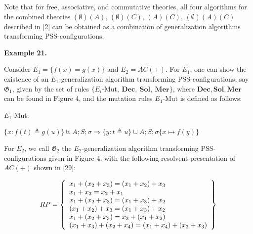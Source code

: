  
 
 
Note that for free, associative, and commutative theories, all four algorithms for the combined theories $(\emptyset)(A)$, $(\emptyset)(C)$, $(A)(C)$, $(\emptyset)(A)(C)$ described in [2] can be obtained as a combination of generalization algorithms transforming PSS-configurations.\par
 
 
 
\par\medskip\noindent\textbf{Example 21.}\par
 
 
Consider $E_{1}=\{f(x)=g(x)\}$ and $E_{2}=AC(+)$. For $E_{1}$, one can show the existence of an $E_{1}$-generalization algorithm transforming PSS-configurations, say $\mathfrak{G}_{1}$, given by the set of rules $\{\text{$E_{i}$-{Mut}},\ \textbf{Dec},\ \textbf{Sol},\ \textbf{Mer}\}$, where $\textbf{Dec},\textbf{Sol},\textbf{Mer}$ can be found in Figure 4, and the mutation rules $E_{1}$-Mut is defined as follows:\par
 
  
 
\par
 
$E_{1}$-Mut:\par
 
\par
 
$\{x:f(t)\triangleq g(u)\}\uplus A;S;\sigma\Longrightarrow\{y:t\triangleq u\}\cup A;S;\sigma\{x\mapsto f(y)\}$\par
 
  
 
For $E_{2}$, we call $\mathfrak{G}_{2}$ the $E_{2}$-generalization algorithm transforming PSS-configurations given in Figure 4, with the following resolvent presentation of $AC(+)$ shown in [29]:\par
  
\par  \quad  \[RP=\left\{\begin{array}[]{l}x_{1}+(x_{2}+x_{3})=(x_{1}+x_{2})+x_{3}\\
x_{1}+x_{2}=x_{2}+x_{1}\\
x_{1}+(x_{2}+x_{3})=(x_{1}+x_{3})+x_{2}\\
(x_{1}+x_{2})+x_{3}=(x_{1}+x_{3})+x_{2}\\
x_{1}+(x_{2}+x_{3})=x_{3}+(x_{1}+x_{2})\\
(x_{1}+x_{3})+(x_{2}+x_{4})=(x_{1}+x_{4})+(x_{2}+x_{3})\end{array}\right\}\]\quad  \quad  
  
